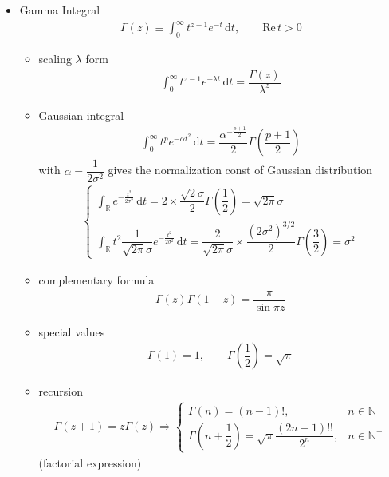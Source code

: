 \begin{itemize}[topsep=2pt,itemsep=0pt]
    \item Gamma Integral
    \begin{align*}
        \Gamma (z)\equiv \int_{0}^\infty t^{z-1}e^{-t}\,\mathrm{d}t,\qquad \mathrm{Re}\,t>0 
    \end{align*}
    \begin{itemize}[topsep=2pt,itemsep=0pt]
        \item scaling $ \lambda  $ form
    \begin{align*}
        \int_{0}^\infty t^{z-1}e^{-\lambda t}\,\mathrm{d}t=\dfrac{\Gamma (z)}{\lambda ^z}
    \end{align*}
    \item Gaussian integral
    \begin{align*}
        \int_0^\infty t^{p}e^{-\alpha t^2}\,\mathrm{d}t= \dfrac{\alpha^{-\frac{p+1}{2}}}{2} \Gamma(\dfrac{p+1}{2})
    \end{align*}
    with $ \alpha =\dfrac{1}{2\sigma ^2} $ gives the normalization const of Gaussian distribution
    \begin{align*}
        \begin{cases}
            \int_\mathbb{R}e^{-\frac{t^2}{2\sigma ^2}}\,\mathrm{d}t=2\times \dfrac{\sqrt{2}\sigma }{2}\Gamma (\dfrac{1}{2})={\sqrt{2\pi}\sigma }\\
            \int_\mathbb{R}t^2 \dfrac{1}{\sqrt{2\pi}\sigma }e^{-\frac{t^2}{2\sigma ^2}}\,\mathrm{d}t=\dfrac{2}{\sqrt{2\pi}\sigma  }\times \dfrac{(2\sigma^2 )^{3/2}}{2}\Gamma (\dfrac{3}{2}) =\sigma ^2
        \end{cases}
    \end{align*}
    
    
    
    
    \item complementary formula
    \begin{align*}
        \Gamma (z)\Gamma (1-z)=\dfrac{\pi}{\sin \pi z} 
    \end{align*}
    \item special values
    \begin{align*}
        \Gamma (1)=1,\qquad \Gamma (\dfrac{1}{2})=\sqrt{\pi} 
    \end{align*}
    \item recursion 
    \begin{align*}
        \Gamma (z+1)=z\Gamma (z)\Rightarrow\begin{cases}
            \Gamma (n)=(n-1)!,&n\in\mathbb{N}^+\\
            \Gamma (n+\dfrac{1}{2})=\sqrt{\pi}\dfrac{(2n-1)!!}{2^n},&n\in\mathbb{N}^+
        \end{cases} 
    \end{align*}
    (factorial expression)
    \end{itemize}
    

\end{itemize}
